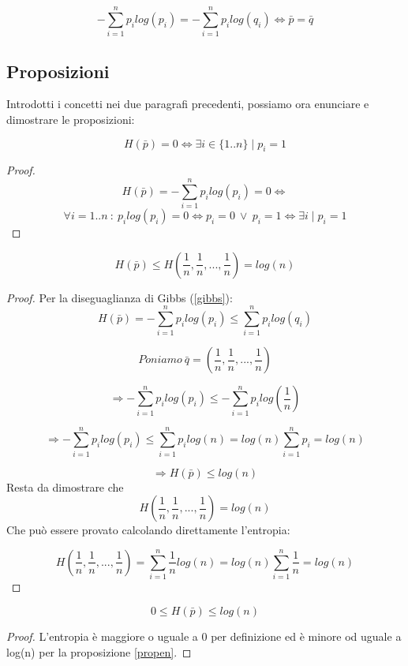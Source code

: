 \begin{osservazione}
 \[ -\sum_{i=1}^n p_i log(p_i) = - \sum_{i=1}^n p_i log(q_i) \iff \bar{p}=\bar{q}\]
\end{osservazione}







\subsection{Proposizioni}
Introdotti i concetti nei due paragrafi precedenti, possiamo ora enunciare e dimostrare 
le proposizioni:
\begin{proposizione}
 \[H(\bar{p})=0 \iff \exists i \in \{1..n\} \mid p_i=1  \]

  \begin{proof}
  \[H(\bar{p})=-\sum_{i=1}^{n}p_i log(p_i)=0 \iff \]
  \[ \forall i=1..n \ : \ p_i log(p_i)=0 \iff 
    p_i=0 \ \lor \ p_i=1 \iff \exists i \mid p_i=1 \]
  \end{proof}
\end{proposizione}

\begin{proposizione}
\label{propen}
 \[H(\bar{p}) \le H(\frac{1}{n},\frac{1}{n},...,\frac{1}{n})=log(n)  \]

  \begin{proof}
  Per la diseguaglianza di Gibbs (\ref{gibbs}):
  \[ H(\bar{p})=-\sum_{i=1}^n p_i log(p_i) \le \sum_{i=1}^n p_i log(q_i)  \]

  \[Poniamo \ \bar{q}=\left ( \frac{1}{n},\frac{1}{n},...,\frac{1}{n} \right) \]

  \[ \Rightarrow -\sum_{i=1}^{n} p_i log(p_i) \le
    -\sum_{i=1}^{n} p_i log \left (\frac{1}{n} \right) \]

  \[ \Rightarrow -\sum_{i=1}^{n} p_i log(p_i) \le
    \sum_{i=1}^{n} p_i log(n) = log(n) \sum_{i=1}^{n} p_i = log(n) \]

  \[ \Rightarrow H(\bar{p}) \le log(n) \]
  Resta da dimostrare che \[H(\frac{1}{n},\frac{1}{n},...,\frac{1}{n})=log(n) \]
  Che può essere provato calcolando direttamente l'entropia:

  \[H(\frac{1}{n},\frac{1}{n},...,\frac{1}{n})=\sum_{i=1}^n \frac{1}{n} log(n)=log(n) \sum_{i=1}^n \frac{1}{n}=log(n) \]


  \end{proof}
\end{proposizione}

\begin{proposizione}
 \[0 \le H(\bar{p}) \le log(n) \]

  \begin{proof}
   L'entropia è maggiore o uguale a 0 per definizione ed è 
   minore od uguale a log(n) per la proposizione \ref{propen}.
  \end{proof}
\end{proposizione}










